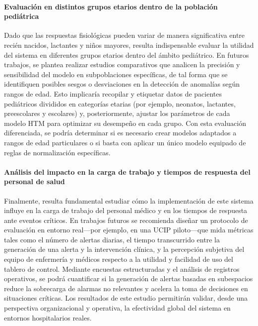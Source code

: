 \paragraph{Evaluación en distintos grupos etarios dentro de la población pediátrica}
Dado que las respuestas fisiológicas pueden variar de manera significativa entre recién nacidos, lactantes y niños mayores, resulta indispensable evaluar la utilidad del sistema en diferentes grupos etarios dentro del ámbito pediátrico. En futuros trabajos, se plantea realizar estudios comparativos que analicen la precisión y sensibilidad del modelo en subpoblaciones específicas, de tal forma que se identifiquen posibles sesgos o desviaciones en la detección de anomalías según rangos de edad. Esto implicaría recopilar y etiquetar datos de pacientes pediátricos divididos en categorías etarias (por ejemplo, neonatos, lactantes, preescolares y escolares) y, posteriormente, ajustar los parámetros de cada modelo HTM para optimizar su desempeño en cada grupo. Con esta evaluación diferenciada, se podría determinar si es necesario crear modelos adaptados a rangos de edad particulares o si basta con aplicar un único modelo equipado de reglas de normalización específicas.

\paragraph{Análisis del impacto en la carga de trabajo y tiempos de respuesta del personal de salud}
Finalmente, resulta fundamental estudiar cómo la implementación de este sistema influye en la carga de trabajo del personal médico y en los tiempos de respuesta ante eventos críticos. En trabajos futuros se recomienda diseñar un protocolo de evaluación en entorno real—por ejemplo, en una UCIP piloto—que mida métricas tales como el número de alertas diarias, el tiempo transcurrido entre la generación de una alerta y la intervención clínica, y la percepción subjetiva del equipo de enfermería y médicos respecto a la utilidad y facilidad de uso del tablero de control. Mediante encuestas estructuradas y el análisis de registros operativos, se podrá cuantificar si la generación de alertas basadas en subespacios reduce la sobrecarga de alarmas no relevantes y acelera la toma de decisiones en situaciones críticas. Los resultados de este estudio permitirán validar, desde una perspectiva organizacional y operativa, la efectividad global del sistema en entornos hospitalarios reales.
